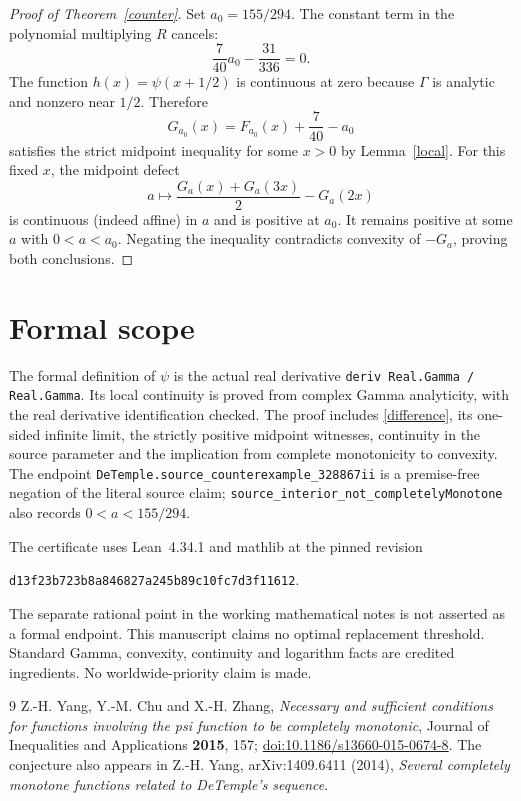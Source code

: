 \documentclass[11pt]{article}
\begin{document}
\begin{proof}[Proof of Theorem~\ref{counter}]
Set $a_0=155/294$. The constant term in the polynomial multiplying $R$ cancels:
\[
 \frac7{40}a_0-\frac{31}{336}=0.
\]
The function $h(x)=\psi(x+1/2)$ is continuous at zero because $\Gamma$ is
analytic and nonzero near $1/2$. Therefore
\[
 G_{a_0}(x)=F_{a_0}(x)+\frac7{40}-a_0
\]
satisfies the strict midpoint inequality for some $x>0$ by Lemma~\ref{local}.
For this fixed $x$, the midpoint defect
\[
 a\longmapsto\frac{G_a(x)+G_a(3x)}2-G_a(2x)
\]
is continuous (indeed affine) in $a$ and is positive at $a_0$. It remains positive
at some $a$ with $0<a<a_0$. Negating the inequality contradicts convexity of
$-G_a$, proving both conclusions.
\end{proof}

\section*{Formal scope}
The formal definition of $\psi$ is the actual real derivative
\texttt{deriv Real.Gamma / Real.Gamma}. Its local continuity is proved from
complex Gamma analyticity, with the real derivative identification checked.
The proof includes \eqref{difference}, its one-sided infinite limit, the
strictly positive midpoint witnesses, continuity in the source parameter and
the implication from complete monotonicity to convexity. The endpoint
\texttt{DeTemple.}\allowbreak\texttt{source\_counterexample\_328867ii} is a premise-free negation
of the literal source claim; \texttt{source\_interior\_not\_}\allowbreak\texttt{completelyMonotone}
also records $0<a<155/294$.

The certificate uses Lean~4.34.1 and mathlib at the pinned revision
\begin{center}
\texttt{d13f23b723b8a846827a245b89c10fc7d3f11612}.
\end{center}
The separate rational point in the working mathematical notes is not asserted
as a formal endpoint. This manuscript claims no optimal replacement threshold.
Standard Gamma, convexity, continuity and logarithm facts are credited
ingredients. No worldwide-priority claim is made.

\begin{thebibliography}{9}
 Z.-H. Yang, Y.-M. Chu and X.-H. Zhang,
\emph{Necessary and sufficient conditions for functions involving the psi
function to be completely monotonic}, Journal of Inequalities and Applications
\textbf{2015}, 157; \href{https://doi.org/10.1186/s13660-015-0674-8}{doi:10.1186/s13660-015-0674-8}.
The conjecture also appears in Z.-H. Yang, arXiv:1409.6411 (2014),
\emph{Several completely monotone functions related to DeTemple's sequence}.
\end{thebibliography}
\end{document}
